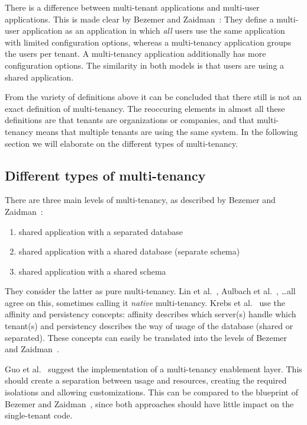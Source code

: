 There is a difference between multi-tenant applications and multi-user applications. This is made clear by Bezemer and Zaidman~\cite{bezemer2010multi}: They define a multi-user application as an application in which \emph{all} users use the same application with limited configuration options, whereas a multi-tenancy application groups the users per tenant. A multi-tenancy application additionally has more configuration options. The similarity in both models is that users are using a shared application. %

From the variety of definitions above it can be concluded that there still is not an exact definition of multi-tenancy. The reoccuring elements in almost all these definitions are that tenants are organizations or companies, and that multi-tenancy means that multiple tenants are using the same system. In the following section we will elaborate on the different types of multi-tenancy. 

\subsection{Different types of multi-tenancy}

There are three main levels of multi-tenancy, as described by Bezemer and Zaidman~\cite{bezemer2010multi}:
\begin{enumerate}
\item shared application with a separated database
\item shared application with a shared database (separate schema)
\item shared application with a shared schema
\end{enumerate}
They consider the latter as pure multi-tenancy. Lin et al.~\cite{lin2009feedback}, Aulbach et al.~\cite{aulbach2009comparison}, \ldots all agree on this, sometimes calling it \emph{native} multi-tenancy. Krebs et al.~\cite{krebs2012architecture} use the affinity and persistency concepts: affinity describes which server(s) handle which tenant(s) and persistency describes the way of usage of the database (shared or separated). These concepts can easily be translated into the levels of Bezemer and Zaidman~\cite{bezemer2010multi}. 


Guo et al.~\cite{guo2007framework} suggest the implementation of a multi-tenancy enablement layer. This should create a separation between usage and resources, creating the required isolations and allowing customizations. This can be compared to the blueprint of Bezemer and Zaidman~\cite{bezemer2010multi}, since both approaches should have little impact on the single-tenant code.

